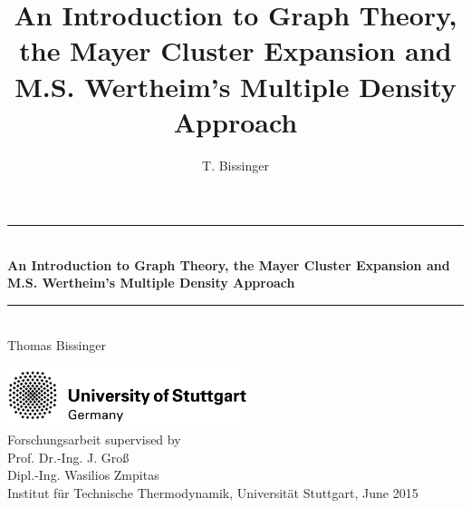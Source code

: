 \documentclass[8.5pt,twoside,twocolumn]{article}
\title{An Introduction to Graph Theory, the Mayer Cluster Expansion and M.S. Wertheim's Multiple Density Approach}
\author{T. Bissinger}
\theoremstyle{standard}
\begin{document}
\begin{titlepage}

\begin{center}


 


\newcommand{\HRule}{\rule{\linewidth}{0.5mm}}

\HRule \\[0.4cm]

{ \huge \bfseries An Introduction to Graph Theory, the Mayer Cluster Expansion and M.S. Wertheim's Multiple Density Approach}


\HRule \\[2cm]

{\LARGE Thomas Bissinger}\\[4cm]

\vfill 

\includegraphics[width=7cm]{./Figures/unistuttgart.jpg}\\[2cm]   

{\Large Forschungsarbeit supervised by \\[.7cm]
Prof. Dr.-Ing. J. Groß \\[.4cm]
Dipl.-Ing. Wasilios Zmpitas}\\[.4cm]


{ \Large  Institut für Technische Thermodynamik, Universität Stuttgart, June 2015}




\end{center}


\end{titlepage}
\newpage
\newpage
\clearpage



{}
\end{document}

